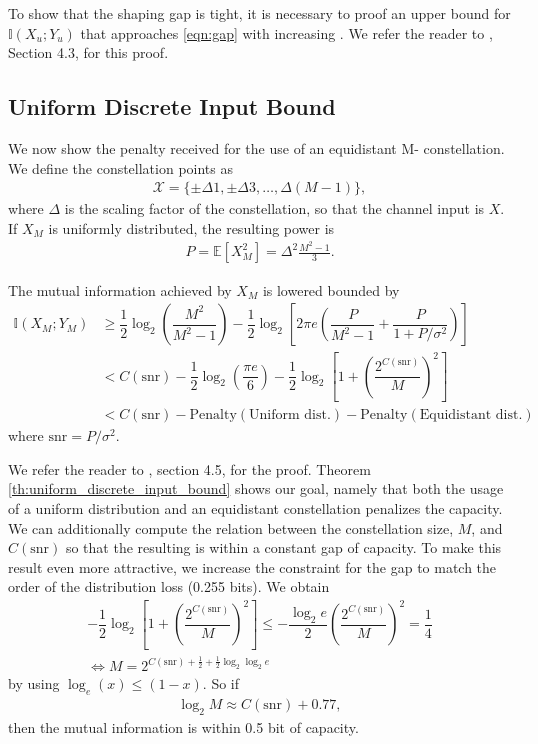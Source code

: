 To show that the shaping gap is tight, it is necessary to proof an upper bound for $\mathbb{I}(X_u;Y_u)$ that approaches \ref{eqn:gap} with increasing . We refer the reader to \cite{BoechererCM}, Section 4.3, for this proof.
\subsection{Uniform Discrete Input Bound}
We now show the penalty received for the use of an equidistant M- constellation. We define the constellation points as
\begin{align}
	\mathcal{X} = \{\pm\Delta 1, \pm\Delta 3,\dots, \Delta(M-1)\},
\end{align}
where $\Delta$ is the scaling factor of the constellation, so that the channel input is $X$. If $X_M$ is uniformly distributed, the resulting power  is
\begin{align}
	P = \mathbb{E}\left[X_{M}^2\right] = \Delta^2\frac{M^2 - 1}{3}.
\end{align}
\begin{theorem}
\label{th:uniform_discrete_input_bound}
The mutual information achieved by $X_M$ is lowered bounded by
\begin{align}
\mathbb{I}(X_M;Y_M) &\geq \dfrac{1}{2} \log_2 \left( \dfrac{M^2}{M^2 -1}\right) - \dfrac{1}{2} \log_2 \left[2\pi e\left( \dfrac{P}{M^2 -1}+ \dfrac{P}{1+P/\sigma^2}\right)\right]\\
& < C(\text{snr}) - \dfrac{1}{2} \log_{2} \left(\dfrac{\pi e}{6}\right) - \dfrac{1}{2} \log_2 \left[1 +\left(\dfrac{2^{C(\text{snr})}}{M}\right)^2\right]\\
& < C(\text{snr}) - \text{Penalty}(\text{Uniform dist.}) - \text{Penalty}(\text{Equidistant dist.})
\end{align}
where $\text{snr} = P/\sigma^2$.
\end{theorem}
We refer the reader to \cite{BoechererCM}, section 4.5, for the proof.
Theorem \ref{th:uniform_discrete_input_bound} shows our goal, namely that both the usage of a uniform distribution and an equidistant constellation penalizes the capacity. We can additionally compute the relation between the constellation size, $M$, and $C(\text{snr})$ so that the resulting  is within a constant gap of capacity. To make this result even more attractive, we increase the constraint for the gap to match the order of the distribution loss (0.255 bits). We obtain
\begin{align}
	- \dfrac{1}{2} \log_2 \left[1 +\left(\dfrac{2^{C(\text{snr})}}{M}\right)^2\right] \leq - \dfrac{\log_2 e}{2} \left(\dfrac{2^{C(\text{snr})}}{M}\right)^2 = \dfrac{1}{4}\\
	\Leftrightarrow M = 2^{C(\text{snr}) + \tfrac{1}{2}+\tfrac{1}{2} \log_2 \log_2 e}
\end{align}
by using $\log_e(x)\leq (1-x)$. So if 
\begin{align}
	\log_2 M \approx C(\text{snr}) +0.77,
\end{align}
then the mutual information is within 0.5 bit of capacity.

